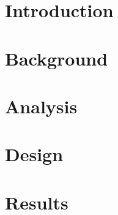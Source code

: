 



\frontmatter{}

%



\pagebreak

\setcounter{tocdepth}{2}
\tableofcontents*


\mainmatter{}


%

\chapter{Introduction}\label{intro}


\chapter{Background}\label{background}


%

\chapter{Analysis}\label{analysis}


\chapter{Design}\label{design}


\chapter{Results}\label{results}


